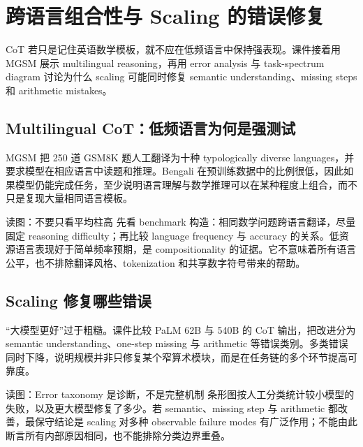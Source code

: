 \section{跨语言组合性与 Scaling 的错误修复}

CoT 若只是记住英语数学模板，就不应在低频语言中保持强表现。课件接着用 MGSM 展示 multilingual reasoning，再用 error analysis 与 task-spectrum diagram 讨论为什么 scaling 可能同时修复 semantic understanding、missing steps 和 arithmetic mistakes。

\subsection{Multilingual CoT：低频语言为何是强测试}

MGSM 把 250 道 GSM8K 题人工翻译为十种 typologically diverse languages，并要求模型在相应语言中读题和推理。Bengali 在预训练数据中的比例很低，因此如果模型仍能完成任务，至少说明语言理解与数学推理可以在某种程度上组合，而不只是复现大量相同语言模板。


\begin{knowledgebox}{读图：不要只看平均柱高}
先看 benchmark 构造：相同数学问题跨语言翻译，尽量固定 reasoning difficulty；再比较 language frequency 与 accuracy 的关系。低资源语言表现好于简单频率预期，是 compositionality 的证据。它不意味着所有语言公平，也不排除翻译风格、tokenization 和共享数字符号带来的帮助。
\end{knowledgebox}


\subsection{Scaling 修复哪些错误}

“大模型更好”过于粗糙。课件比较 PaLM 62B 与 540B 的 CoT 输出，把改进分为 semantic understanding、one-step missing 与 arithmetic 等错误类别。多类错误同时下降，说明规模并非只修复某个窄算术模块，而是在任务链的多个环节提高可靠度。


\begin{knowledgebox}{读图：Error taxonomy 是诊断，不是完整机制}
条形图按人工分类统计较小模型的失败，以及更大模型修复了多少。若 semantic、missing step 与 arithmetic 都改善，最保守结论是 scaling 对多种 observable failure modes 有广泛作用；不能由此断言所有内部原因相同，也不能排除分类边界重叠。
\end{knowledgebox}

